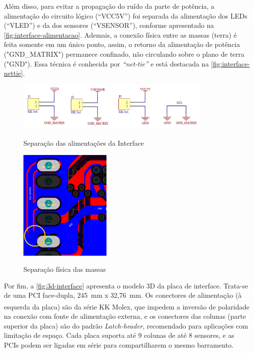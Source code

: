 Além disso, para evitar a propagação do ruído da parte de potência, a alimentação do circuito lógico (``VCC5V'') foi separada da alimentação dos LEDs (``VLED'') e da dos sensores (``VSENSOR''), conforme apresentado na \autoref{fig:interface-alimentacao}. Ademais, a conexão física entre as massas (terra) é feita somente em um único ponto, assim, o retorno da alimentação de potência ("GND\_MATRIX") permanece confinado, não circulando sobre o plano de terra ("GND"). Essa técnica é conhecida por \emph{``net-tie''} e está destacada na \autoref{fig:interface-nettie}.

\begin{figure}[H]
    \centering
    \caption{Separação das alimentações da Interface}
    \includegraphics[width=0.85\textwidth]{./dados/figuras/alimentacao-interface}
    \label{fig:interface-alimentacao}
\end{figure}

\begin{figure}[H]
    \centering
    \caption{Separação física das massas}
    \includegraphics[width=0.4\textwidth]{./dados/figuras/nt-interface}
    \label{fig:interface-nettie}
\end{figure}

Por fim, a \autoref{fig:3d-interface} apresenta o modelo 3D da placa de interface. Trata-se de uma PCI face-dupla, {245\ mm} x {32,76\ mm}. Os conectores de alimentação (à esquerda da placa) são da série KK Molex\textsuperscript{\textregistered}, que impedem a inversão de polaridade na conexão com fonte de alimentação externa, e os conectores das colunas (parte superior da placa) são do padrão \emph{Latch-header}, recomendado para aplicações com limitação de espaço. Cada placa suporta até 9 colunas de até 8 sensores, e as PCIs podem ser ligadas em série para compartilharem o mesmo barramento.

